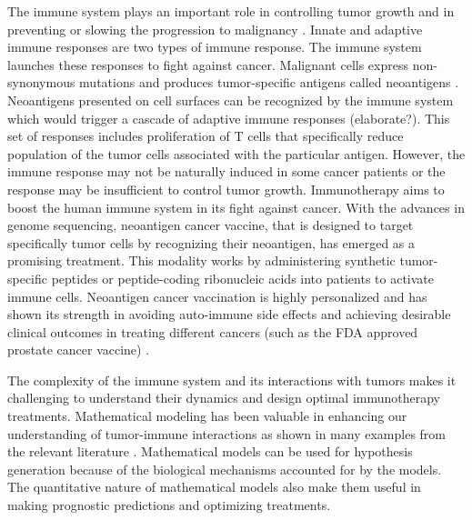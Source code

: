 \documentclass[review,authoryear]{elsarticle}
\begin{document}
The immune system plays an important role in controlling tumor growth
and in preventing or slowing the progression to malignancy \citep{Waldman2020}. Innate and adaptive
immune responses are two types of immune response. The immune system
launches these responses to fight against cancer. Malignant cells express non-synonymous mutations
and produces tumor-specific antigens called neoantigens \citep{Peng2019}.
Neoantigens presented on cell surfaces can be recognized by the immune system which would trigger a cascade of adaptive
immune responses (elaborate?). This set of responses includes proliferation of T cells
that specifically reduce population of the tumor cells associated with the particular antigen.
However, the immune response may not be naturally induced in some cancer patients or the response may be  insufficient to control tumor growth. Immunotherapy aims to boost the human immune system in its fight
against cancer. With the advances in genome sequencing, neoantigen
cancer vaccine, that is designed to target specifically tumor cells
by recognizing their neoantigen, has emerged as a promising treatment. This modality works by administering synthetic tumor-specific
peptides or peptide-coding ribonucleic acids into patients to activate immune cells. Neoantigen cancer vaccination is highly personalized and has shown its strength in avoiding auto-immune
side effects \citep{Nelde2021} and achieving desirable clinical outcomes in
treating different cancers (such as the FDA approved prostate cancer vaccine)
\citep[e.g.][]{Ott2017,Pan2018,Peng2019}. 

The complexity of the immune system and its interactions with tumors
makes it challenging to understand their dynamics and design optimal
immunotherapy treatments. Mathematical modeling has been valuable in enhancing our understanding of tumor-immune interactions as shown in many examples from the relevant literature \citep[e.g., see reviews by][and references therein]{Eftimie2016,Mahlbacher2019,Nukala2021}. Mathematical models can be used for hypothesis
generation because of the biological mechanisms accounted for by the models. The
quantitative nature of mathematical models also make them useful in making prognostic predictions and optimizing treatments. 
\end{document}
